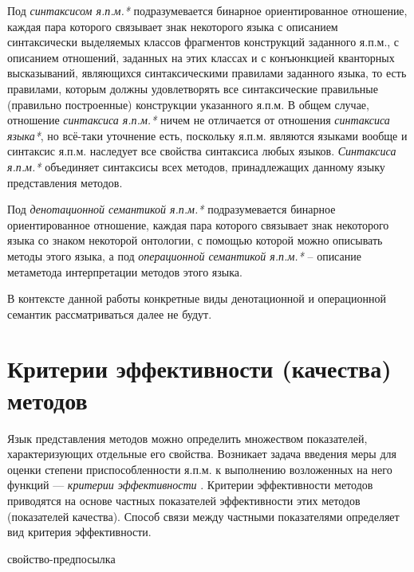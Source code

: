 Под \textit{синтаксисом я.п.м.*} подразумевается бинарное ориентированное отношение, каждая пара которого связывает знак некоторого языка с описанием синтаксически выделяемых классов фрагментов конструкций заданного я.п.м., с описанием отношений, заданных на этих классах и с конъюнкцией кванторных высказываний, являющихся синтаксическими правилами заданного языка, то есть правилами, которым должны удовлетворять все синтаксические правильные (правильно построенные) конструкции указанного я.п.м. В общем случае, отношение \textit{синтаксиса я.п.м.*} ничем не отличается от отношения \textit{синтаксиса языка*}, но всё-таки уточнение есть, поскольку я.п.м. являются языками вообще и синтаксис я.п.м. наследует все свойства синтаксиса любых языков. \textit{Синтаксиса я.п.м.*} объединяет синтаксисы всех методов, принадлежащих данному языку представления методов.

Под \textit{денотационной семантикой я.п.м.*} подразумевается бинарное ориентированное отношение, каждая пара которого связывает знак некоторого языка со знаком некоторой онтологии, с помощью которой можно описывать методы этого языка, а под \textit{операционной семантикой я.п.м.*} -- описание метаметода интерпретации методов этого языка.

В контексте данной работы конкретные виды денотационной и операционной семантик рассматриваться далее не будут.

\section{Критерии эффективности (качества) методов}

Язык представления методов можно определить множеством показателей, характеризующих отдельные его свойства. Возникает задача введения меры для оценки степени приспособленности я.п.м. к выполнению возложенных на него функций — \textit{критерии эффективности} \cite{Orlov2013}. Критерии эффективности методов приводятся на основе частных показателей эффективности этих методов (показателей качества). Способ связи между частными показателями определяет вид критерия эффективности.

\begin{SCn}
\begin{scnrelfromlist}{свойство-предпосылка}
\end{scnrelfromlist}
\end{SCn}

